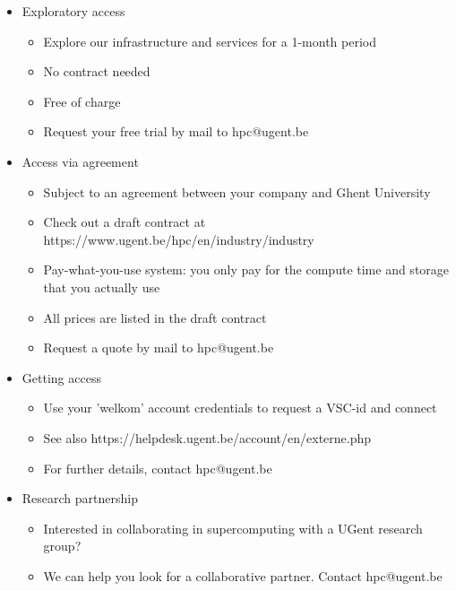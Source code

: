 \begin{itemize}
  \item Exploratory access
  \begin{itemize}
    \item Explore our infrastructure and services for a 1-month period
    \item No contract needed
    \item Free of charge
    \item Request your free trial by mail to hpc@ugent.be
  \end{itemize}
  \item Access via agreement
  \begin{itemize}
    \item Subject to an agreement between your company and Ghent University
    \item Check out a draft contract at https://www.ugent.be/hpc/en/industry/industry
    \item Pay-what-you-use system: you only pay for the compute time and storage that you actually use
    \item All prices are listed in the draft contract
    \item Request a quote by mail to hpc@ugent.be
  \end{itemize}
  \item Getting access
  \begin{itemize}
    \item Use your 'welkom' account credentials to request a VSC-id and connect
    \item See also https://helpdesk.ugent.be/account/en/externe.php
    \item For further details, contact hpc@ugent.be
  \end{itemize}
  \item Research partnership
  \begin{itemize}
    \item Interested in collaborating in supercomputing with a UGent research group?
    \item We can help you look for a collaborative partner. Contact hpc@ugent.be
  \end{itemize}
\end{itemize}
